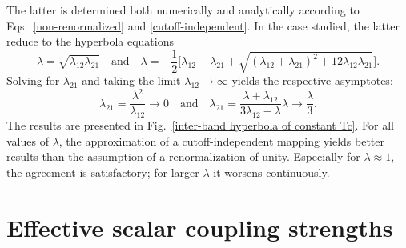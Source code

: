 The latter is determined both numerically and analytically according to
Eqs.~\ref{non-renormalized} and \ref{cutoff-independent}. In the case studied,
the latter reduce to the hyperbola equations
%
\begin{equation*}
    \lambda = \sqrt{\lambda_{1 2} \lambda_{2 1}}
    \quad \text{and} \quad
    \lambda = -\frac 1 2 \Big[ \lambda_{1 2} + \lambda_{2 1} + \sqrt{
        (\lambda_{1 2} + \lambda_{2 1})^2
        + 12 \lambda_{1 2} \lambda_{2 1}
        }
    \Big].
\end{equation*}
%
Solving for $\lambda_{2 1}$ and taking the limit $\lambda_{1 2} \rightarrow
\infty$ yields the respective asymptotes:
%
\begin{equation*}
    \lambda_{2 1} = \frac{\lambda^2}{\lambda_{1 2}} \rightarrow 0
    \quad \text{and} \quad
    \lambda_{2 1} = \frac{\lambda + \lambda_{1 2}}{3 \lambda_{1 2} - \lambda}
    \lambda \rightarrow \frac \lambda 3.
\end{equation*}
%
The results are presented in Fig.~\ref{inter-band hyperbola of constant Tc}. For
all values of $\lambda$, the approximation of a cutoff-independent mapping
yields better results than the assumption of a renormalization of unity.
Especially for $\lambda \approx 1$, the agreement is satisfactory; for larger
$\lambda$ it worsens continuously.

\section{Effective scalar coupling strengths}

